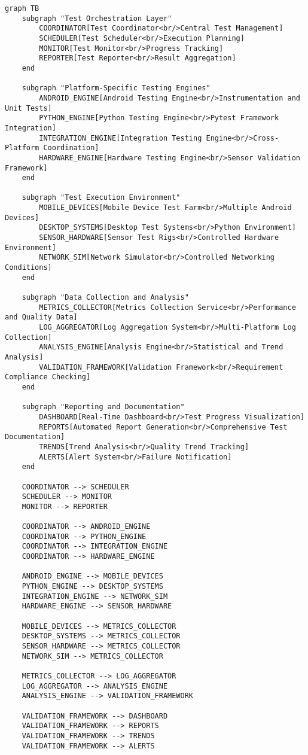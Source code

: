 \documentclass[12pt,a4paper]{article}
\begin{document}
\begin{verbatim}
graph TB
    subgraph "Test Orchestration Layer"
        COORDINATOR[Test Coordinator<br/>Central Test Management]
        SCHEDULER[Test Scheduler<br/>Execution Planning]
        MONITOR[Test Monitor<br/>Progress Tracking]
        REPORTER[Test Reporter<br/>Result Aggregation]
    end
    
    subgraph "Platform-Specific Testing Engines"
        ANDROID_ENGINE[Android Testing Engine<br/>Instrumentation and Unit Tests]
        PYTHON_ENGINE[Python Testing Engine<br/>Pytest Framework Integration]
        INTEGRATION_ENGINE[Integration Testing Engine<br/>Cross-Platform Coordination]
        HARDWARE_ENGINE[Hardware Testing Engine<br/>Sensor Validation Framework]
    end
    
    subgraph "Test Execution Environment"
        MOBILE_DEVICES[Mobile Device Test Farm<br/>Multiple Android Devices]
        DESKTOP_SYSTEMS[Desktop Test Systems<br/>Python Environment]
        SENSOR_HARDWARE[Sensor Test Rigs<br/>Controlled Hardware Environment]
        NETWORK_SIM[Network Simulator<br/>Controlled Networking Conditions]
    end
    
    subgraph "Data Collection and Analysis"
        METRICS_COLLECTOR[Metrics Collection Service<br/>Performance and Quality Data]
        LOG_AGGREGATOR[Log Aggregation System<br/>Multi-Platform Log Collection]
        ANALYSIS_ENGINE[Analysis Engine<br/>Statistical and Trend Analysis]
        VALIDATION_FRAMEWORK[Validation Framework<br/>Requirement Compliance Checking]
    end
    
    subgraph "Reporting and Documentation"
        DASHBOARD[Real-Time Dashboard<br/>Test Progress Visualization]
        REPORTS[Automated Report Generation<br/>Comprehensive Test Documentation]
        TRENDS[Trend Analysis<br/>Quality Trend Tracking]
        ALERTS[Alert System<br/>Failure Notification]
    end
    
    COORDINATOR --> SCHEDULER
    SCHEDULER --> MONITOR
    MONITOR --> REPORTER
    
    COORDINATOR --> ANDROID_ENGINE
    COORDINATOR --> PYTHON_ENGINE
    COORDINATOR --> INTEGRATION_ENGINE
    COORDINATOR --> HARDWARE_ENGINE
    
    ANDROID_ENGINE --> MOBILE_DEVICES
    PYTHON_ENGINE --> DESKTOP_SYSTEMS
    INTEGRATION_ENGINE --> NETWORK_SIM
    HARDWARE_ENGINE --> SENSOR_HARDWARE
    
    MOBILE_DEVICES --> METRICS_COLLECTOR
    DESKTOP_SYSTEMS --> METRICS_COLLECTOR
    SENSOR_HARDWARE --> METRICS_COLLECTOR
    NETWORK_SIM --> METRICS_COLLECTOR
    
    METRICS_COLLECTOR --> LOG_AGGREGATOR
    LOG_AGGREGATOR --> ANALYSIS_ENGINE
    ANALYSIS_ENGINE --> VALIDATION_FRAMEWORK
    
    VALIDATION_FRAMEWORK --> DASHBOARD
    VALIDATION_FRAMEWORK --> REPORTS
    VALIDATION_FRAMEWORK --> TRENDS
    VALIDATION_FRAMEWORK --> ALERTS
\end{verbatim}
\end{document}
